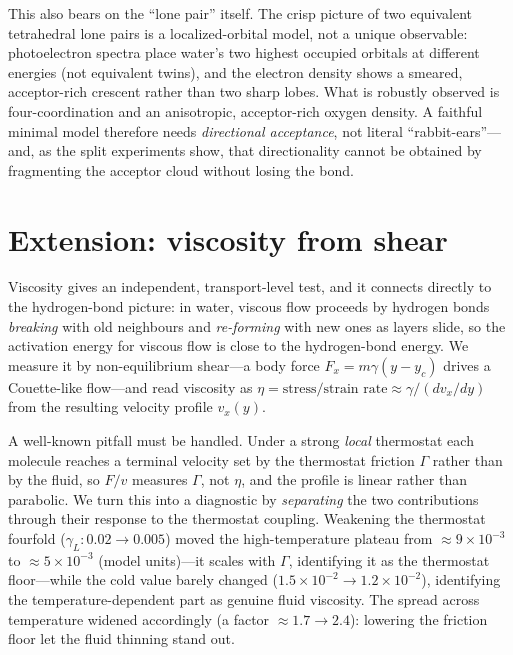 \documentclass[11pt]{article}
\begin{document}
This also bears on the ``lone pair'' itself. The crisp picture of two equivalent tetrahedral
lone pairs is a localized-orbital model, not a unique observable: photoelectron spectra place
water's two highest occupied orbitals at different energies (not equivalent twins), and the
electron density shows a smeared, acceptor-rich crescent rather than two sharp lobes. What is
robustly observed is four-coordination and an anisotropic, acceptor-rich oxygen density. A
faithful minimal model therefore needs \emph{directional acceptance}, not literal
``rabbit-ears''---and, as the split experiments show, that directionality cannot be obtained
by fragmenting the acceptor cloud without losing the bond.

\section{Extension: viscosity from shear}

Viscosity gives an independent, transport-level test, and it connects directly to the
hydrogen-bond picture: in water, viscous flow proceeds by hydrogen bonds \emph{breaking}
with old neighbours and \emph{re-forming} with new ones as layers slide, so the activation
energy for viscous flow is close to the hydrogen-bond energy. We measure it by
non-equilibrium shear---a body force $F_x = m\gamma(y-y_c)$ drives a Couette-like flow---and
read viscosity as $\eta = \text{stress}/\text{strain rate} \approx \gamma/(dv_x/dy)$ from the
resulting velocity profile $v_x(y)$.

A well-known pitfall must be handled. Under a strong \emph{local} thermostat each molecule
reaches a terminal velocity set by the thermostat friction $\Gamma$ rather than by the fluid,
so $F/v$ measures $\Gamma$, not $\eta$, and the profile is linear rather than parabolic. We
turn this into a diagnostic by \emph{separating} the two contributions through their response
to the thermostat coupling. Weakening the thermostat fourfold ($\gamma_L: 0.02 \to 0.005$)
moved the high-temperature plateau from $\approx 9\times10^{-3}$ to $\approx 5\times10^{-3}$
(model units)---it scales with $\Gamma$, identifying it as the thermostat floor---while the
cold value barely changed ($1.5\times10^{-2} \to 1.2\times10^{-2}$), identifying the
temperature-dependent part as genuine fluid viscosity. The spread across temperature widened
accordingly (a factor $\approx1.7 \to 2.4$): lowering the friction floor let the fluid
thinning stand out.
\end{document}

